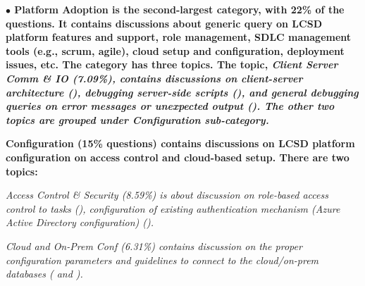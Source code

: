 



\nd\bf{$\bullet$ Platform  Adoption} is the second-largest category, with 22\% of the questions. It contains discussions about generic query on LCSD platform features
and support, role management, SDLC management tools (e.g., scrum, agile), cloud setup and configuration, deployment issues, etc. The category has three topics. The topic, \it{Client Server Comm \& IO (7.09\%)}, contains discussions on client-server architecture (), debugging server-side
scripts (), and general debugging queries on error messages or
unexpected output (). The other two topics are grouped under Configuration sub-category. 

\begin{inparaenum}[(i)]
    \item \bf{{Configuration (15\% questions)}} contains discussions on LCSD platform configuration on access control and cloud-based setup. There are two topics:
    \begin{inparaenum}[(1)] \item \it{Access Control \& Security (8.59\%)} is about
    discussion on role-based access control to tasks (), configuration of existing
    authentication mechanism (Azure Active Directory configuration) ().
    \item \it{Cloud and On-Prem Conf (6.31\%)} contains discussion on the proper configuration parameters and 
    guidelines to connect to the cloud/on-prem databases ( and ).
    \end{inparaenum} 
\end{inparaenum}



